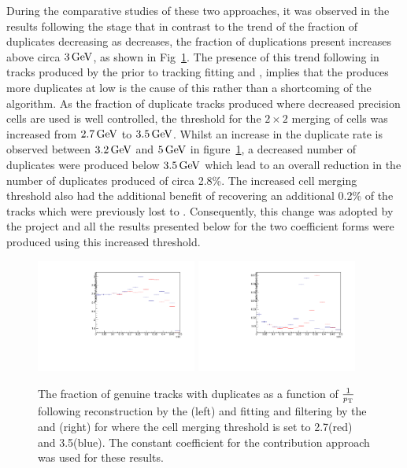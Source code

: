 {During the comparative studies of these two approaches, it was observed in the results following the \DR stage that in contrast to the trend of the fraction of duplicates decreasing as \pT decreases, the fraction of duplications present increases above circa $3\,\text{Ge\hspace{-.08em}V}$, as shown in Fig~\ref{fig:2GeVfracDups}.
The presence of this trend following in tracks produced by the \HT prior to tracking fitting and \DR, implies that the \HT produces more duplicates at low \pT is the cause of this rather than a shortcoming of the \DR algorithm.
As the fraction of duplicate tracks produced where decreased precision \HT cells are used is well controlled, the \pT threshold for the $2 \times 2$ merging of \HT cells was increased from $2.7\,\text{Ge\hspace{-.08em}V}$ to $3.5\,\text{Ge\hspace{-.08em}V}$.
Whilst an increase in the duplicate rate is observed between $3.2\,\text{Ge\hspace{-.08em}V}$ and $5\,\text{Ge\hspace{-.08em}V}$ in figure~\ref{fig:2GeVfracDups}, a decreased number of duplicates were produced below $3.5\,\text{Ge\hspace{-.08em}V}$ which lead to an overall reduction in the number of duplicates produced of circa 2.8\%.
The increased \HT cell merging threshold also had the additional benefit of recovering an additional 0.2\% of the tracks which were previously lost to \MS.
Consequently, this change was adopted by the project and all the results presented below for the two \MS coefficient forms were produced using this increased threshold. 

\begin{figure}[tbp]
\centering
\includegraphics[width=0.47\textwidth]{figs/tk-upgrade/results-lowPtTracking/htFracDuplicatesVsInvPtTiltedGeometry_5000.pdf}
\includegraphics[width=0.47\textwidth]{figs/tk-upgrade/results-lowPtTracking/kfFracDuplicatesVsInvPtTiltedGeometry_5000.pdf}
\caption{The fraction of genuine tracks with duplicates as a function of $\frac{1}{p_{\mathrm{T}}}$ following reconstruction by the \HT (left) and fitting and filtering by the \KF and \DR (right) for where the \HT cell merging \pT threshold is set to 2.7\GeV (red) and 3.5\GeV (blue). 
The constant coefficient for the \MS contribution approach was used for these \KF results.
}
\label{fig:2GeVfracDups}
\end{figure}

}
